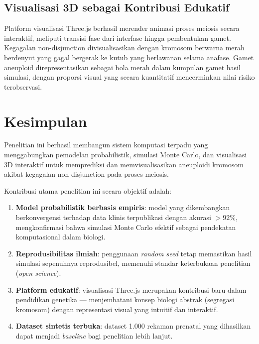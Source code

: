 \documentclass[10pt,a4paper,twocolumn]{article}
\begin{document}
\subsection{Visualisasi 3D sebagai Kontribusi Edukatif}

Platform visualisasi Three.js berhasil merender animasi proses meiosis secara
interaktif, meliputi transisi fase dari interfase hingga pembentukan gamet.
Kegagalan non-disjunction divisualisasikan dengan kromosom berwarna merah berdenyut
yang gagal bergerak ke kutub yang berlawanan selama anafase. Gamet aneuploid
direpresentasikan sebagai bola merah dalam kumpulan gamet hasil simulasi,
dengan proporsi visual yang secara kuantitatif mencerminkan nilai risiko terobservasi.

\section{Kesimpulan}

Penelitian ini berhasil membangun sistem komputasi terpadu yang menggabungkan
pemodelan probabilistik, simulasi Monte Carlo, dan visualisasi 3D interaktif
untuk memprediksi dan memvisualisasikan aneuploidi kromosom akibat kegagalan
non-disjunction pada proses meiosis.

Kontribusi utama penelitian ini secara objektif adalah:

\begin{enumerate}[leftmargin=*,noitemsep,topsep=2pt]
    \item \textbf{Model probabilistik berbasis empiris}: model yang dikembangkan
        berkonvergensi terhadap data klinis terpublikasi dengan akurasi $>92\%$,
        mengkonfirmasi bahwa simulasi Monte Carlo efektif sebagai pendekatan
        komputasional dalam biologi.
    \item \textbf{Reprodusibilitas ilmiah}: penggunaan \textit{random seed} tetap
        memastikan hasil simulasi sepenuhnya reprodusibel, memenuhi standar
        keterbukaan penelitian (\textit{open science}).
    \item \textbf{Platform edukatif}: visualisasi Three.js merupakan kontribusi
        baru dalam pendidikan genetika --- menjembatani konsep biologi abstrak
        (segregasi kromosom) dengan representasi visual yang intuitif dan interaktif.
    \item \textbf{Dataset sintetis terbuka}: dataset 1.000 rekaman prenatal yang
        dihasilkan dapat menjadi \textit{baseline} bagi penelitian lebih lanjut.
\end{enumerate}
\end{document}
